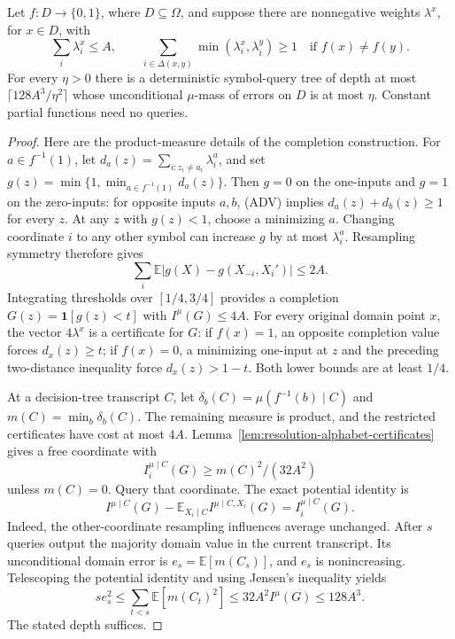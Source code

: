 \begin{theorem}
\label{thm:resolution-alphabet-completion}
Let \(f:D\to\{0,1\}\), where \(D\subseteq\Omega\), and suppose
there are nonnegative weights \(\lambda^x\), for \(x\in D\), with
\[
 \sum_i\lambda_i^x\le A,
 \qquad
 \sum_{i\in\Delta(x,y)}\min(\lambda_i^x,\lambda_i^y)\ge1
 \quad\text{if }f(x)\ne f(y).
 \tag{ADV}
\]
For every \(\eta>0\) there is a deterministic symbol-query tree of
depth at most \(\lceil128A^3/\eta^2\rceil\) whose unconditional
\(\mu\)-mass of errors on \(D\) is at most \(\eta\).
Constant partial functions need no queries.
\end{theorem}

\begin{proof}
Here are the product-measure details of the completion construction.
For \(a\in f^{-1}(1)\), let
\(d_a(z)=\sum_{i:z_i\ne a_i}\lambda_i^a\), and set
\(g(z)=\min\{1,\min_{a\in f^{-1}(1)}d_a(z)\}\).
Then \(g=0\) on the one-inputs and \(g=1\) on the zero-inputs:
for opposite inputs \(a,b\), (ADV) implies
\(d_a(z)+d_b(z)\ge1\) for every \(z\).
At any \(z\) with \(g(z)<1\), choose a minimizing \(a\).
Changing coordinate \(i\) to any other symbol can increase \(g\)
by at most \(\lambda_i^a\). Resampling symmetry therefore gives
\[
 \sum_i\mathbb E|g(X)-g(X_{-i},X_i')|\le2A.
\]
Integrating thresholds over \([1/4,3/4]\) provides a completion
\(G(z)=\mathbf1[g(z)<t]\) with \(I^\mu(G)\le4A\).
For every original domain point \(x\), the vector \(4\lambda^x\)
is a certificate for \(G\): if \(f(x)=1\), an opposite completion
value forces \(d_x(z)\ge t\); if \(f(x)=0\), a minimizing
one-input at \(z\) and the preceding two-distance inequality force
\(d_x(z)>1-t\). Both lower bounds are at least \(1/4\).

At a decision-tree transcript \(C\), let
\(\delta_b(C)=\mu(f^{-1}(b)\mid C)\) and
\(m(C)=\min_b\delta_b(C)\). The remaining measure is product,
and the restricted certificates have cost at most \(4A\).
Lemma~\ref{lem:resolution-alphabet-certificates} gives a free
coordinate with
\[
 I_i^{\mu\mid C}(G)\ge m(C)^2/(32A^2)
\]
unless \(m(C)=0\). Query that coordinate. The exact potential
identity is
\[
 I^{\mu\mid C}(G)
 -\mathbb E_{X_i\mid C} I^{\mu\mid C,X_i}(G)
 = I_i^{\mu\mid C}(G).
\]
Indeed, the other-coordinate resampling influences average unchanged.
After \(s\) queries output the majority domain value in the current
transcript. Its unconditional domain error is
\(e_s=\mathbb E[m(C_s)]\), and \(e_s\) is nonincreasing.
Telescoping the potential identity and using Jensen's inequality yields
\[
 s e_s^2\le\sum_{t<s}\mathbb E[m(C_t)^2]
 \le32A^2 I^\mu(G)\le128A^3.
\]
The stated depth suffices.
\end{proof}

